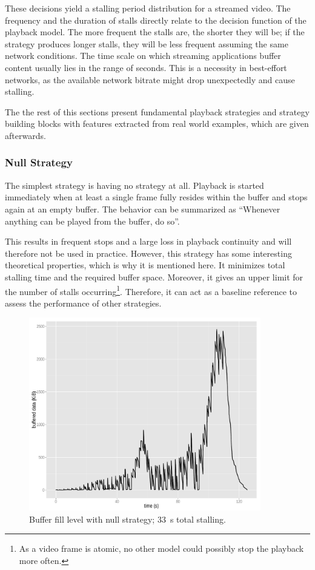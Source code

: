 These decisions yield a stalling period distribution for a streamed video. The frequency and the duration of stalls directly relate to the decision function of the playback model. The more frequent the stalls are, the shorter they will be; if the strategy produces longer stalls, they will be less frequent assuming the same network conditions. The time scale on which streaming applications buffer content usually lies in the range of seconds. This is a necessity in best-effort networks, as the available network bitrate might drop unexpectedly and cause stalling.


The the rest of this sections present fundamental playback strategies and strategy building blocks with features extracted from real world examples, which are given afterwards. 



\subsubsection{Null Strategy}

The simplest strategy is having no strategy at all. Playback is started immediately when at least a single frame fully resides within the buffer and stops again at an empty buffer. The behavior can be summarized as ``Whenever anything can be played from the buffer, do so''.

This results in frequent stops and a large loss in playback continuity and will therefore not be used in practice. However, this strategy has some interesting theoretical properties, which is why it is mentioned here.
It minimizes total stalling time and the required buffer space. Moreover, it gives an upper limit for the number of stalls occurring\footnote{As a video frame is atomic, no other model could possibly stop the playback more often.}. Therefore, it can act as a baseline reference to assess the performance of other strategies.


\begin{figure}[htb]
    \centering
    \includegraphics[width=0.9\textwidth]{images/R-bufferlevel-stall.pdf}
    \caption{Buffer fill level with null strategy; \SI{33}{\second} total stalling.}
    \label{c3:fig:bufferlevel-stall}
\end{figure}

